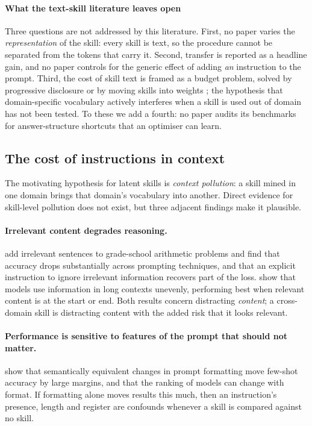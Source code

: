 \documentclass[11pt]{article}
\begin{document}
\paragraph{What the text-skill literature leaves open} Three questions are not addressed by this
literature. First, no paper varies the \emph{representation} of the skill: every skill is text, so
the procedure cannot be separated from the tokens that carry it. Second, transfer is reported as a
headline gain, and no paper controls for the generic effect of adding \emph{an} instruction to the
prompt. Third, the cost of skill text is framed as a budget problem, solved by progressive
disclosure or by moving skills into weights \citep{anthropic2025skills,yu2026latentskill}; the
hypothesis that domain-specific vocabulary actively interferes when a skill is used out of domain
has not been tested. To these we add a fourth: no paper audits its benchmarks for answer-structure
shortcuts that an optimiser can learn.

\subsection{The cost of instructions in context}

The motivating hypothesis for latent skills is \emph{context pollution}: a skill mined in one domain
brings that domain's vocabulary into another. Direct evidence for skill-level pollution does not
exist, but three adjacent findings make it plausible.

\paragraph{Irrelevant content degrades reasoning.} \citet{shi2023distracted} add irrelevant
sentences to grade-school arithmetic problems and find that accuracy drops substantially across
prompting techniques, and that an explicit instruction to ignore irrelevant information recovers
part of the loss. \citet{liu2024lost} show that models use information in long contexts unevenly,
performing best when relevant content is at the start or end. Both results concern distracting
\emph{content}; a cross-domain skill is distracting content with the added risk that it looks
relevant.

\paragraph{Performance is sensitive to features of the prompt that should not matter.}
\citet{sclar2024formatting} show that semantically equivalent changes in prompt formatting move
few-shot accuracy by large margins, and that the ranking of models can change with format. If
formatting alone moves results this much, then an instruction's presence, length and register are
confounds whenever a skill is compared against no skill.
\end{document}
